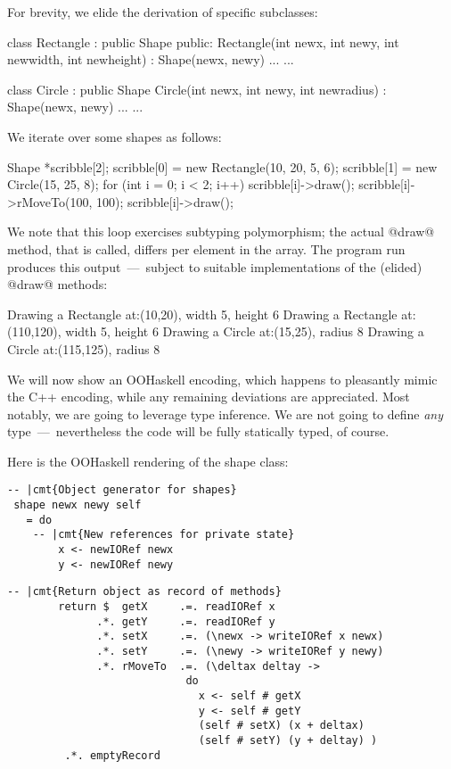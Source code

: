 For brevity, we elide the derivation of specific subclasses:

\begin{code}
 class Rectangle : public Shape {
 public:
  Rectangle(int newx, int newy, int newwidth, int newheight)
           : Shape(newx, newy) { ... }
  ...
 }
\end{code}

\begin{code}
 class Circle : public Shape {
  Circle(int newx, int newy, int newradius)
        : Shape(newx, newy) { ... }
  ...
 }
\end{code}

We iterate over some shapes as follows:

\begin{code}
 Shape *scribble[2];
 scribble[0] = new Rectangle(10, 20, 5, 6);
 scribble[1] = new Circle(15, 25, 8);
 for (int i = 0; i < 2; i++) {
   scribble[i]->draw();
   scribble[i]->rMoveTo(100, 100);
   scribble[i]->draw();
 }
\end{code}

We note that this loop exercises subtyping polymorphism; the actual
@draw@ method, that is called, differs per element in the array. The
program run produces this output~---~subject to suitable
implementations of the (elided) @draw@ methods:

\begin{code}
 Drawing a Rectangle at:(10,20), width 5, height 6
 Drawing a Rectangle at:(110,120), width 5, height 6
 Drawing a Circle at:(15,25), radius 8
 Drawing a Circle at:(115,125), radius 8
\end{code}

We will now show an OOHaskell encoding, which happens to pleasantly
mimic the C++ encoding, while any remaining deviations are
appreciated. Most notably, we are going to leverage type inference.
We are not going to define \emph{any} type~---~nevertheless the code
will be fully statically typed, of course.

\smallskip

Here is the OOHaskell rendering of the shape class:

\begin{Verbatim}[fontsize=\small,commandchars=\|\{\}]
 -- |cmt{Object generator for shapes}
 shape newx newy self
   = do
	-- |cmt{New references for private state}
        x <- newIORef newx
        y <- newIORef newy
\end{Verbatim}

\begin{Verbatim}[fontsize=\small,commandchars=\|\{\}]
	-- |cmt{Return object as record of methods}
        return $  getX     .=. readIORef x
              .*. getY     .=. readIORef y
              .*. setX     .=. (\newx -> writeIORef x newx)
              .*. setY     .=. (\newy -> writeIORef y newy)
              .*. rMoveTo  .=. (\deltax deltay -> 
                            do
                              x <- self # getX
                              y <- self # getY
                              (self # setX) (x + deltax)
                              (self # setY) (y + deltay) )
         .*. emptyRecord
\end{Verbatim}

